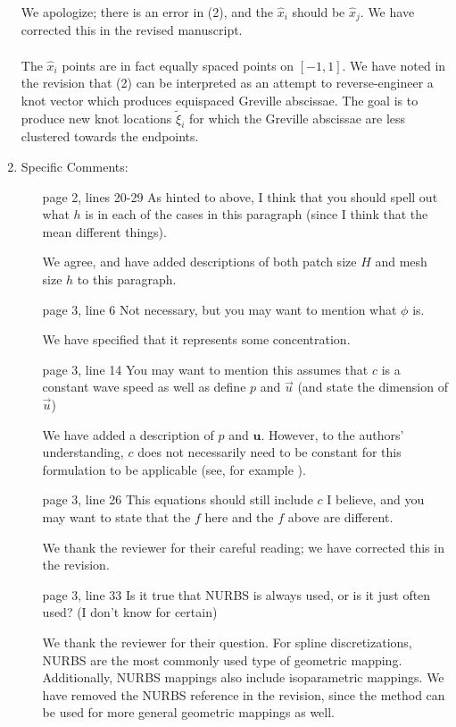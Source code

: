 \documentclass[10pt]{article}
\newcommand{\note}[1]{{\color{violet}#1}}
\begin{document}
\begin{enumerate}
\note{We apologize; there is an error in (2), and the $\hat{x}_i$ should be $\hat{x}_j$.  We have corrected this in the revised manuscript.
\\
\\
The $\hat{x}_i$ points are in fact equally spaced points on $[-1,1]$.  We have noted in the revision that (2) can be interpreted as an attempt to reverse-engineer a knot vector which produces equispaced Greville abscissae. The goal is to produce new knot locations $\tilde{\xi}_i$ for which the Greville abscissae are less clustered towards the endpoints.  
}

\item Specific Comments:
\begin{enumerate}
\item [page 2, lines 20-29] As hinted to above, I think that you should spell out what $h$ is in each of the cases in this paragraph (since I think that the mean different things).

\note{We agree, and have added descriptions of both patch size $H$ and mesh size $h$ to this paragraph.}

\item [page 3, line 6] Not necessary, but you may want to mention what $\phi$ is.

\note{We have specified that it represents some concentration.}

\item [page 3, line 14] You may want to mention this assumes that $c$ is a constant wave speed as well as define $p$ and $\vec{u}$ (and state the dimension of $\vec{u}$)

\note{We have added a description of $p$ and $\bm{u}$.  However, to the authors' understanding, $c$ does not necessarily need to be constant for this formulation to be applicable (see, for example \cite{chan2017weight1,mercerat2015nodal}). }

\item [page 3, line 26] This equations should still include $c$ I believe, and you may want to state that the $f$ here and the $f$ above are different.

\note{We thank the reviewer for their careful reading; we have corrected this in the revision.}

\item [page 3, line 33] Is it true that NURBS is always used, or is it just often used? (I don't know for certain)

\note{We thank the reviewer for their question.  For spline discretizations, NURBS are the most commonly used type of geometric mapping.  Additionally, NURBS mappings also include isoparametric mappings.  We have removed the NURBS reference in the revision, since the method can be used for more general geometric mappings as well.}


\end{enumerate}
\end{enumerate}
\end{document}
